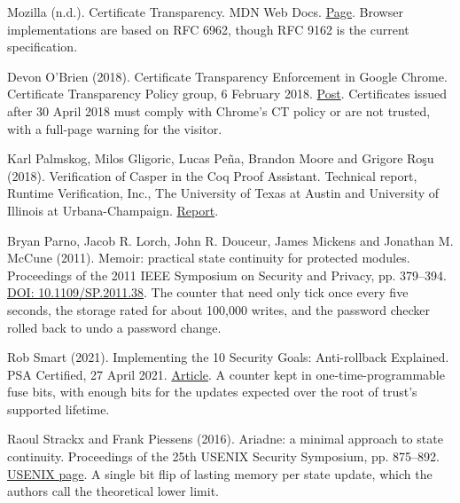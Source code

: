 \documentclass[11pt,twoside]{article}
\theoremstyle{thielethm}
\theoremstyle{thieledef}
\theoremstyle{thieledef}
\theoremstyle{thieledef}
\theoremstyle{thielethm}
\theoremstyle{thieleobs}
\theoremstyle{thielethm}
\begin{document}
\noindent Mozilla (n.d.). Certificate Transparency. MDN Web Docs. \href{https://developer.mozilla.org/en-US/docs/Web/Security/Defenses/Certificate_Transparency}{Page}. Browser implementations are based on RFC 6962, though RFC 9162 is the current specification.
\par\medskip

\noindent Devon O'Brien (2018). Certificate Transparency Enforcement in Google Chrome. Certificate Transparency Policy group, 6 February 2018. \href{https://groups.google.com/a/chromium.org/g/ct-policy/c/wHILiYf31DE/m/iMFmpMEkAQAJ}{Post}. Certificates issued after 30 April 2018 must comply with Chrome's CT policy or are not trusted, with a full-page warning for the visitor.
\par\medskip

\noindent Karl Palmskog, Milos Gligoric, Lucas Pe\~na, Brandon Moore and Grigore Ro\c{s}u (2018). Verification of Casper in the Coq Proof Assistant. Technical report, Runtime Verification, Inc., The University of Texas at Austin and University of Illinois at Urbana-Champaign. \href{https://github.com/runtimeverification/casper-proofs/blob/master/report/report.pdf}{Report}.
\par\medskip

\noindent Bryan Parno, Jacob R. Lorch, John R. Douceur, James Mickens and Jonathan M. McCune (2011). Memoir: practical state continuity for protected modules. Proceedings of the 2011 IEEE Symposium on Security and Privacy, pp. 379--394. \href{https://doi.org/10.1109/SP.2011.38}{DOI: 10.1109/SP.2011.38}. The counter that need only tick once every five seconds, the storage rated for about 100,000 writes, and the password checker rolled back to undo a password change.
\par\medskip

\noindent Rob Smart (2021). Implementing the 10 Security Goals: Anti-rollback Explained. PSA Certified, 27 April 2021. \href{https://www.psacertified.org/blog/anti-rollback-explained/}{Article}. A counter kept in one-time-programmable fuse bits, with enough bits for the updates expected over the root of trust's supported lifetime.
\par\medskip

\noindent Raoul Strackx and Frank Piessens (2016). Ariadne: a minimal approach to state continuity. Proceedings of the 25th USENIX Security Symposium, pp. 875--892. \href{https://www.usenix.org/conference/usenixsecurity16/technical-sessions/presentation/strackx}{USENIX page}. A single bit flip of lasting memory per state update, which the authors call the theoretical lower limit.
\par\medskip
\end{document}
